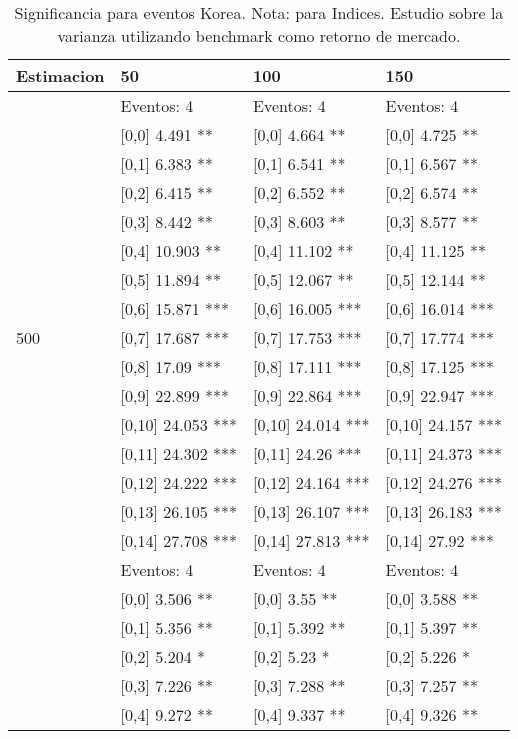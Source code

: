 \begin{table}

\caption{Significancia para eventos Korea. Nota: para Indices. Estudio sobre la varianza utilizando benchmark como retorno de mercado.}
\centering
\begin{tabular}[t]{llll}
\toprule
Estimacion & 50 & 100 & 150\\
\midrule
 & Eventos:  4 & Eventos:  4 & Eventos:  4\\
 & {}[0,0] 4.491 ** & {}[0,0] 4.664 ** & {}[0,0] 4.725 **\\
 & {}[0,1] 6.383 ** & {}[0,1] 6.541 ** & {}[0,1] 6.567 **\\
 & {}[0,2] 6.415 ** & {}[0,2] 6.552 ** & {}[0,2] 6.574 **\\
 & {}[0,3] 8.442 ** & {}[0,3] 8.603 ** & {}[0,3] 8.577 **\\
\addlinespace
 & {}[0,4] 10.903 ** & {}[0,4] 11.102 ** & {}[0,4] 11.125 **\\
 & {}[0,5] 11.894 ** & {}[0,5] 12.067 ** & {}[0,5] 12.144 **\\
 & {}[0,6] 15.871 *** & {}[0,6] 16.005 *** & {}[0,6] 16.014 ***\\
500 & {}[0,7] 17.687 *** & {}[0,7] 17.753 *** & {}[0,7] 17.774 ***\\
 & {}[0,8] 17.09 *** & {}[0,8] 17.111 *** & {}[0,8] 17.125 ***\\
\addlinespace
 & {}[0,9] 22.899 *** & {}[0,9] 22.864 *** & {}[0,9] 22.947 ***\\
 & {}[0,10] 24.053 *** & {}[0,10] 24.014 *** & {}[0,10] 24.157 ***\\
 & {}[0,11] 24.302 *** & {}[0,11] 24.26 *** & {}[0,11] 24.373 ***\\
 & {}[0,12] 24.222 *** & {}[0,12] 24.164 *** & {}[0,12] 24.276 ***\\
 & {}[0,13] 26.105 *** & {}[0,13] 26.107 *** & {}[0,13] 26.183 ***\\
\addlinespace
 & {}[0,14] 27.708 *** & {}[0,14] 27.813 *** & {}[0,14] 27.92 ***\\
 & Eventos:  4 & Eventos:  4 & Eventos:  4\\
 & {}[0,0] 3.506 ** & {}[0,0] 3.55 ** & {}[0,0] 3.588 **\\
 & {}[0,1] 5.356 ** & {}[0,1] 5.392 ** & {}[0,1] 5.397 **\\
 & {}[0,2] 5.204 * & {}[0,2] 5.23 * & {}[0,2] 5.226 *\\
\addlinespace
 & {}[0,3] 7.226 ** & {}[0,3] 7.288 ** & {}[0,3] 7.257 **\\
 & {}[0,4] 9.272 ** & {}[0,4] 9.337 ** & {}[0,4] 9.326 **\\

\end{tabular}
\end{table}
